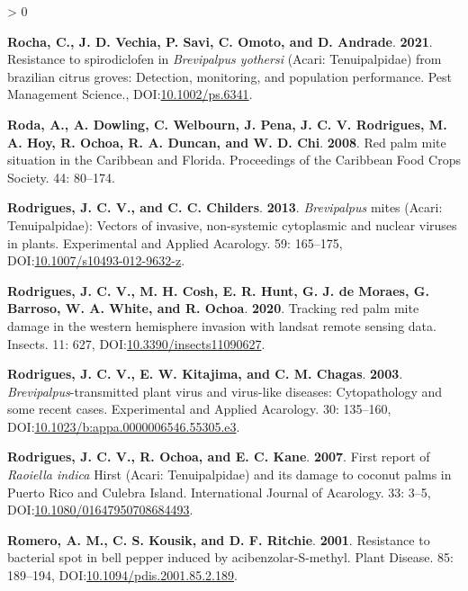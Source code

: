 \documentclass{ufdissertation}[overrideChapters] %
\newlength{\cslhangindent}
\newenvironment{CSLReferences}[2] %
 {%
  \setlength{\parindent}{0pt}
  \ifodd #1 \everypar{\setlength{\hangindent}{\cslhangindent}}\ignorespaces\fi
  \ifnum #2 > 0
  \setlength{\parskip}{#2\baselineskip}
  \fi
 }%
 {}
\begin{document}
{\begin{CSLReferences}{1}{1}
\leavevmode{}%
\textbf{Rocha, C., J. D. Vechia, P. Savi, C. Omoto, and D. Andrade}. \textbf{2021}. Resistance to spirodiclofen in {\emph{Brevipalpus yothersi}} ({Acari}: {Tenuipalpidae}) from brazilian citrus groves: Detection, monitoring, and population performance. Pest Management Science., DOI:\href{https://doi.org/10.1002/ps.6341}{10.1002/ps.6341}.

\leavevmode{}%
\textbf{Roda, A., A. Dowling, C. Welbourn, J. Pena, J. C. V. Rodrigues, M. A. Hoy, R. Ochoa, R. A. Duncan, and W. D. Chi}. \textbf{2008}. Red palm mite situation in the {Caribbean} and {Florida}. Proceedings of the Caribbean Food Crops Society. 44: 80--174.

\leavevmode{}%
\textbf{Rodrigues, J. C. V., and C. C. Childers}. \textbf{2013}. {\emph{Brevipalpus}} mites ({Acari}: {Tenuipalpidae}): Vectors of invasive, non-systemic cytoplasmic and nuclear viruses in plants. Experimental and Applied Acarology. 59: 165--175, DOI:\href{https://doi.org/10.1007/s10493-012-9632-z}{10.1007/s10493-012-9632-z}.

\leavevmode{}%
\textbf{Rodrigues, J. C. V., M. H. Cosh, E. R. Hunt, G. J. de Moraes, G. Barroso, W. A. White, and R. Ochoa}. \textbf{2020}. Tracking red palm mite damage in the western hemisphere invasion with landsat remote sensing data. Insects. 11: 627, DOI:\href{https://doi.org/10.3390/insects11090627}{10.3390/insects11090627}.

\leavevmode{}%
\textbf{Rodrigues, J. C. V., E. W. Kitajima, and C. M. Chagas}. \textbf{2003}. {\emph{Brevipalpus}}-transmitted plant virus and virus-like diseases: Cytopathology and some recent cases. Experimental and Applied Acarology. 30: 135--160, DOI:\href{https://doi.org/10.1023/b:appa.0000006546.55305.e3}{10.1023/b:appa.0000006546.55305.e3}.

\leavevmode{}%
\textbf{Rodrigues, J. C. V., R. Ochoa, and E. C. Kane}. \textbf{2007}. First report of {\emph{Raoiella indica}} {Hirst} ({Acari}: {Tenuipalpidae}) and its damage to coconut palms in {Puerto Rico} and {Culebra Island}. International Journal of Acarology. 33: 3--5, DOI:\href{https://doi.org/10.1080/01647950708684493}{10.1080/01647950708684493}.

\leavevmode{}%
\textbf{Romero, A. M., C. S. Kousik, and D. F. Ritchie}. \textbf{2001}. Resistance to bacterial spot in bell pepper induced by acibenzolar-{S}-methyl. Plant Disease. 85: 189--194, DOI:\href{https://doi.org/10.1094/pdis.2001.85.2.189}{10.1094/pdis.2001.85.2.189}.


\end{CSLReferences}}
\end{document}
